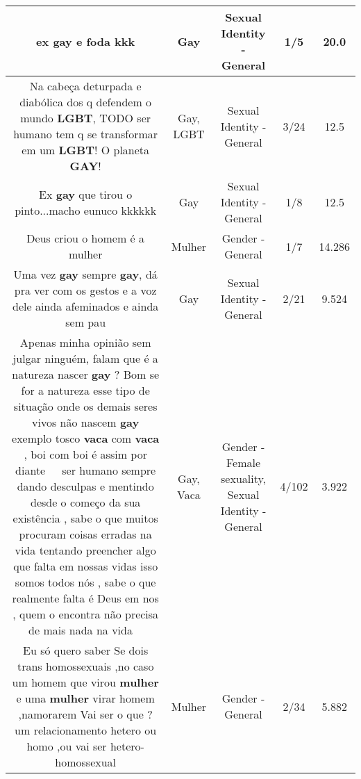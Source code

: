 \documentclass[11pt]{article}
\newlength\mylength
\begin{document}
\begin{center}
\begin{longtable}{|C{.65\mylength}|C{.30\mylength}|C{.12\mylength}|C{.12\mylength}|C{.12\mylength}|}
  \small ex \textbf{gay} e foda kkk\normalsize   & Gay & Sexual Identity - General & 1/5 & 20.0 \\  \hline
  \small Na cabeça deturpada e diabólica dos q defendem o mundo \textbf{LGBT}, TODO ser humano tem q se transformar em um \textbf{LGBT}! O planeta \textbf{GAY}!\normalsize   & Gay, LGBT & Sexual Identity - General & 3/24 & 12.5 \\  \hline
  \small Ex \textbf{gay} que tirou o pinto...macho eunuco kkkkkk\normalsize   & Gay & Sexual Identity - General & 1/8 & 12.5 \\  \hline
  \small Deus criou o homem é  a mulher\normalsize   & Mulher & Gender - General & 1/7 & 14.286 \\  \hline
  \small Uma vez \textbf{gay} sempre \textbf{gay}, dá pra ver com os gestos e a voz dele ainda afeminados e ainda sem pau\normalsize   & Gay & Sexual Identity - General & 2/21 & 9.524 \\  \hline
  \small Apenas minha opinião sem julgar ninguém, falam que é a natureza nascer \textbf{gay} ? Bom se for a natureza esse tipo de situação onde os demais seres vivos não nascem \textbf{gay} exemplo tosco  \textbf{vaca} com \textbf{vaca} , boi com boi é assim por diante 🤷🏼‍♂️ ser humano sempre dando desculpas e mentindo desde o começo da sua existência , sabe o que muitos procuram coisas erradas na vida tentando preencher algo que falta em nossas vidas isso somos todos nós , sabe o que realmente falta é Deus em nos , quem o encontra não precisa de mais nada na vida 🙏🏻\normalsize   & Gay, Vaca & Gender - Female sexuality, Sexual Identity - General & 4/102 & 3.922 \\  \hline
  \small Eu só quero saber Se dois trans homossexuais ,no caso um homem que virou \textbf{mulher} e uma \textbf{mulher} virar homem ,namorarem Vai ser o que ?um relacionamento hetero ou homo ,ou vai ser hetero-homossexual\normalsize   & Mulher & Gender - General & 2/34 & 5.882 \\  \hline

\end{longtable}
\end{center}
\end{document}
